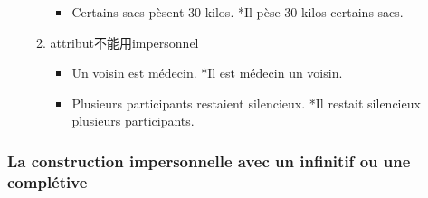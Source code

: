 \documentclass[UTF8]{report}
\begin{document}
\begin{enumerate}
\begin{enumerate}
\begin{itemize}
            \item Certains sacs pèsent 30 kilos. *Il pèse 30 kilos certains sacs.
        \end{itemize}
        \item attribut不能用impersonnel
        \begin{itemize}
            \item Un voisin est médecin. *Il est médecin un voisin.
            \item Plusieurs participants restaient silencieux. *Il restait silencieux plusieurs participants.
        \end{itemize}
    \end{enumerate}
\end{enumerate}

\subsubsection{La construction impersonnelle avec un infinitif ou une complétive}
\end{document}
